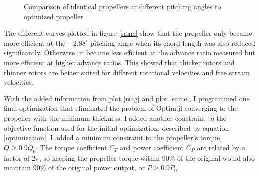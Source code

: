 \documentclass[journal ]{new-aiaa}
\begin{document}
\begin{figure}[H]
\centering
	
	\caption{Comparison of identical propellers at different pitching angles to optimized propeller}
	\captionsetup{aboveskip=0pt,font=it}
	\label{same}
\end{figure}

The different curves plotted in figure \eqref{same} show that the propeller only became more efficient at the $-2.88^{\circ}$ pitching angle when its chord length was also reduced significantly. Otherwise, it became less efficient at the advance ratio measured but more efficient at higher advance ratios. This showed that thicker rotors and thinner rotors are better suited for different rotational velocities and free stream velocities.

With the added information from plot \eqref{mag} and plot \eqref{same}, I programmed one final optimization that eliminated the problem of Optim.jl converging to the propeller with the minimum thickness. I added another constraint to the objective function used for the initial optimization, described by equation \eqref{optimization}. I added a minimum constraint to the propeller's torque, $Q \geq 0.9 Q_{0}$. The torque coefficient $C_{T}$ and power coefficient $C_{P}$ are related by a factor of $2 \pi$, so keeping the propeller torque within 90\% of the original would also maintain 90\% of the original power output, or $P \geq 0.9 P_{0}$.
\end{document}
